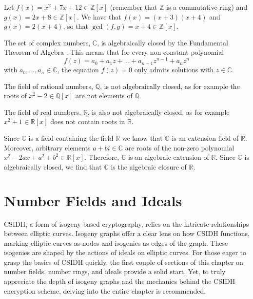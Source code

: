 \documentclass[openany, a4paper, 10pt]{book}
\theoremstyle{plain}
\theoremstyle{plain}
\theoremstyle{plain}
\theoremstyle{definition}
\theoremstyle{plain}
\theoremstyle{definition}
\theoremstyle{remark}
\begin{document}
\begin{examplebox}
    Let $f(x) = x^2+7x+12 \in \mathbb Z[x]$ (remember that $\mathbb Z$ is a commutative ring) and $g(x) = 2x+8 \in \mathbb Z[x]$.
    We have that $f(x) = (x+3)(x+4)$ and $g(x) = 2(x+4)$, so that $\gcd(f,g) = x+4 \in \mathbb Z[x]$.
    \tcbline

    The set of complex numbers, $\mathbb C$, is algebraically closed by the Fundamental Theorem of Algebra \cite{fundamental}.
    This means that for every non-constant polynomial
    \begin{equation*}
        f(z) = a_0 + a_1z + \dots + a_{n-1} z^{n-1} + a_n z^n
    \end{equation*}
    with $a_0, \dots, a_n \in \mathbb C$, the equation $f(z)=0$ only admits solutions with $z \in \mathbb C$.

    \tcbline

    The field of rational numbers, $\mathbb Q$, is not algebraically closed, as for example the roots of $x^2-2 \in \mathbb Q[x]$ are not elements of $\mathbb Q$.

    The field of real numbers, $\mathbb R$, is also not algebraically closed, as for example $x^2+1 \in \mathbb R[x]$ does not contain roots in $\mathbb R$.

    Since $\mathbb C$ is a field containing the field $\mathbb R$ we know that $\mathbb C$ is an extension field of $\mathbb R$.
    Moreover, arbitrary elements $a+bi \in \mathbb C$ are roots of the non-zero polynomial $x^2-2ax+a^2+b^2 \in \mathbb R[x]$.
    Therefore, $\mathbb C$ is an algebraic extension of $\mathbb R$.
    Since $\mathbb C$ is algebraically closed, we find that $\mathbb C$ is the algebraic closure of $\mathbb R$.
\end{examplebox}


\chapter{Number Fields and Ideals}\label{chap:number_fields}
CSIDH, a form of isogeny-based cryptography, relies on the intricate relationships between elliptic curves.
Isogeny graphs offer a clear lens on how CSIDH functions, marking elliptic curves as nodes and isogenies as edges of the graph.
These isogenies are shaped by the actions of ideals on elliptic curves.
For those eager to grasp the basics of CSIDH quickly, the first couple of sections of this chapter on number fields, number rings, and ideals provide a solid start.
Yet, to truly appreciate the depth of isogeny graphs and the mechanics behind the CSIDH encryption scheme, delving into the entire chapter is recommended.
\end{document}
